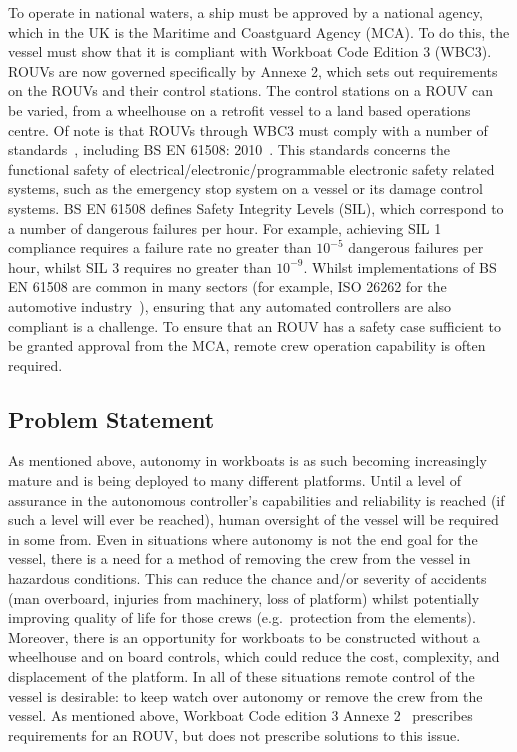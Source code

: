 \documentclass[../main.tex]{subfiles}
\begin{document}
To operate in national waters, a ship must be approved by a national agency, which in the UK is the Maritime and Coastguard Agency (MCA).
To do this, the vessel must show that it is compliant with Workboat Code Edition 3 (WBC3).
ROUVs are now governed specifically by Annexe 2, which sets out requirements on the ROUVs and their control stations.
The control stations on a ROUV can be varied, from a wheelhouse on a retrofit vessel to a land based operations centre.
Of note is that ROUVs through WBC3 must comply with a number of standards~\cite{MIN698}, including BS EN 61508: 2010~\cite{IEC61508}.
This standards concerns the functional safety of electrical/electronic/programmable electronic safety related systems, such as the emergency stop system on a vessel or its damage control systems.
BS EN 61508 defines Safety Integrity Levels (SIL), which correspond to a number of dangerous failures per hour.
For example, achieving SIL 1 compliance requires a failure rate no greater than $10^{-5}$ dangerous failures per hour, whilst SIL 3 requires no greater than $10^{-9}$.
Whilst implementations of BS EN 61508 are common in many sectors (for example, ISO 26262 for the automotive industry~\cite{ISO26262}), ensuring that any automated controllers are also compliant is a challenge.
To ensure that an ROUV has a safety case sufficient to be granted approval from the MCA, remote crew operation capability is often required.

\subsection{Problem Statement}\label{1.2}

As mentioned above, autonomy in workboats is as such becoming increasingly mature and is being deployed to many different platforms.
Until a level of assurance in the autonomous controller's capabilities and reliability is reached (if such a level will ever be reached), human oversight of the vessel will be required in some from.
Even in situations where autonomy is not the end goal for the vessel, there is a need for a method of removing the crew from the vessel in hazardous conditions.
This can reduce the chance and/or severity of accidents (man overboard, injuries from machinery, loss of platform) whilst potentially improving quality of life for those crews
(e.g.\ protection from the elements).
Moreover, there is an opportunity for workboats to be constructed without a wheelhouse and on board controls, which could reduce the cost, complexity, and displacement of the platform.
In all of these situations remote control of the vessel is desirable: to keep watch over autonomy or remove the crew from the vessel.
As mentioned above, Workboat Code edition 3 Annexe 2~\cite{WBC3} prescribes requirements for an ROUV, but does not prescribe solutions to this issue.
\end{document}
